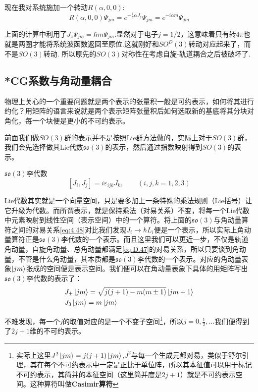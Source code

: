 现在我对系统施加一个转动$R(\alpha,0,0)$:
\[R(\alpha,0,0)\Psi_{jm}=e^{-\frac{i}{\hbar}\alpha J_z}\Psi_{jm}=e^{-i\alpha m}\Psi_{jm}\]

上面的计算中利用了$J_z\Psi_{jm}=\hbar m\Psi_{jm}$.显然对于电子$j=1/2$，这意味着只有转$4\pi$也就是两圈才能将系统波函数返回至原位.这就刚好和$SO^D(3)$转动对应起来了，而不是$SO(3)$转动. 所以原先的$SO(3)$对称性在考虑自旋-轨道耦合之后被破坏了.
\subsection{*CG系数与角动量耦合}
物理上关心的一个重要问题就是两个表示的张量积一般是可约表示，如何将其进行约化？用矩阵的语言来说就是两个表示矩阵张量积后如何选取新的基底将其分块对角化，每一个块便是更小的不可约表示。

前面我们做$SO(3)$群的表示并不是按照Lie群方法做的，实际上对于$SO(3)$群，我们会先选择做其Lie代数$\mathfrak{so}(3)$的表示，然后通过指数映射得到$SO(3)$的表示。
\begin{define}{$\mathfrak{so}(3)$李代数}
	\begin{equation}
		\label{eq:D.47}
		[J_i,J_j]=i\varepsilon_{ijk}J_k,\qquad(i,j,k=1,2,3)
	\end{equation}
\end{define}

Lie代数其实就是一个向量空间，只是要多加上一条特殊的乘法规则（Lie括号）让它升级为代数。而所谓表示，就是保持乘法（对易关系）不变，将每一个Lie代数中元素映射到线性空间（表示空间）中的一个算符。将上面的$\mathfrak{so}(3)$与角动量算符之间的对易关系\ref{eq:4.48}对比我们发现$J_i\to\hbar L_i$便是一个表示，所以实际上角动量算符正是$\mathfrak{so}(3)$李代数的一个表示。而且这里我们可以更近一步，不仅是轨道角动量，自旋角动量、总角动量都满足\ref{eq:D.47}的对易关系，所以只要谈到角动量，不管是什么角动量，其本质都是$\mathfrak{so}(3)$李代数的一个表示。对应的角动量表象$\ket{jm}$张成的空间便是表示空间。我们便可以在角动量表象下具体的用矩阵写出$\mathfrak{so}(3)$李代数的表示了：
\begin{align}
	&\label{eq:D.48}J_\pm\ket{jm}=\sqrt{j(j+1)-m(m\pm1)}\ket{jm+1}\\
	&\label{eq:D.49}J_3\ket{jm}=m\ket{jm}
\end{align}

不难发现，每一个$j$的取值对应的是一个不变子空间\footnote{实际上这里$J^2\ket{jm}=j(j+1)\ket{jm}$,$J^2$与每一个生成元都对易，类似于舒尔引理，其在每个不可约表示中一定是正比于单位阵，所以其本征值可以用于标记不可约表示，其简并的本征空间（这里简并度是$2j+1$）就是不可约表示空间。这种算符叫做\textbf{Casimir算符}}，所以$j=0,\frac{1}{2},\ldots$我们便得到了$2j+1$维的不可约表示。

